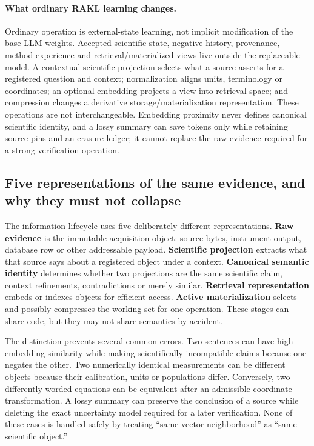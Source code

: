 \paragraph{What ordinary RAKL learning changes.}
Ordinary \RAKL{} operation is external-state learning, not implicit modification of the base LLM weights. Accepted scientific state, negative history, provenance, method experience and retrieval/materialized views live outside the replaceable model. A contextual scientific projection selects what a source asserts for a registered question and context; normalization aligns units, terminology or coordinates; an optional embedding projects a view into retrieval space; and compression changes a derivative storage/materialization representation. These operations are not interchangeable. Embedding proximity never defines canonical scientific identity, and a lossy summary can save tokens only while retaining source pins and an erasure ledger; it cannot replace the raw evidence required for a strong verification operation.

\subsection{Five representations of the same evidence, and why they must not collapse}

The information lifecycle uses five deliberately different representations. \textbf{Raw evidence} is the immutable acquisition object: source bytes, instrument output, database row or other addressable payload. \textbf{Scientific projection} extracts what that source says about a registered object under a context. \textbf{Canonical semantic identity} determines whether two projections are the same scientific claim, context refinements, contradictions or merely similar. \textbf{Retrieval representation} embeds or indexes objects for efficient access. \textbf{Active materialization} selects and possibly compresses the working set for one operation. These stages can share code, but they may not share semantics by accident.

The distinction prevents several common errors. Two sentences can have high embedding similarity while making scientifically incompatible claims because one negates the other. Two numerically identical measurements can be different objects because their calibration, units or populations differ. Conversely, two differently worded equations can be equivalent after an admissible coordinate transformation. A lossy summary can preserve the conclusion of a source while deleting the exact uncertainty model required for a later verification. None of these cases is handled safely by treating ``same vector neighborhood'' as ``same scientific object.''

